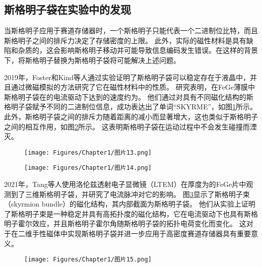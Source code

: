 \subsection{斯格明子袋在实验中的发现}
当斯格明子应用于赛道存储器时，一个斯格明子只能代表一个二进制位比特，而且斯格明子之间的排斥力决定了存储密度的上限。
此外，实际的磁性材料是具有缺陷和杂质的，这会影响斯格明子移动并可能导致信息编码发生错误。在这样的背景下，将斯格明子替换为斯格明子袋将可能解决上述问题。\par
2019年，Foster和Kind等人通过实验证明了斯格明子袋可以稳定存在于液晶中，并且通过微磁模拟的方法研究了它在磁性材料中的性质。
研究表明，在FeGe薄膜中斯格明子袋在的电流驱动下达到的速度约为。
他们通过对具有不同磁化结构的斯格明子袋赋予不同的二进制位信息，成功表达出了单词“SKYRME”，如图\ref{图1.13}所示。
此外，斯格明子袋之间的排斥力随着距离的减小而显著增大，这也类似于斯格明子之间的相互作用，如图\ref{图1.14}所示。
这表明斯格明子袋在运动过程中不会发生碰撞而湮灭。
\begin{figure}[H]
    \centering
    \texttt{[image: Figures/Chapter1/图片13.png]}
    \label{图1.13}
\end{figure}
\begin{figure}[H]
    \centering
    \texttt{[image: Figures/Chapter1/图片14.png]}
    \label{图1.14}
\end{figure}\par
2021年，Tang等人使用洛伦兹透射电子显微镜（LTEM）在厚度为的FeGe片中观测到了三维斯格明子袋，并研究了电流脉冲对它的影响。
图\ref{图1.15}显示了斯格明子束（skyrmion bundle）的磁化结构，其内部截面为斯格明子袋。
他们从实验上证明了斯格明子束是一种稳定并具有高拓扑度的磁化结构，它在电流驱动下也具有斯格明子霍尔效应，并且斯格明子霍尔角随斯格明子袋的拓扑电荷变化而变化。
这对于在二维手性磁体中实现斯格明子袋并进一步应用于高密度赛道存储器具有重要意义。
\begin{figure}[htb]
    \centering
    \texttt{[image: Figures/Chapter1/图片15.png]}
    \label{图1.15}
\end{figure}
